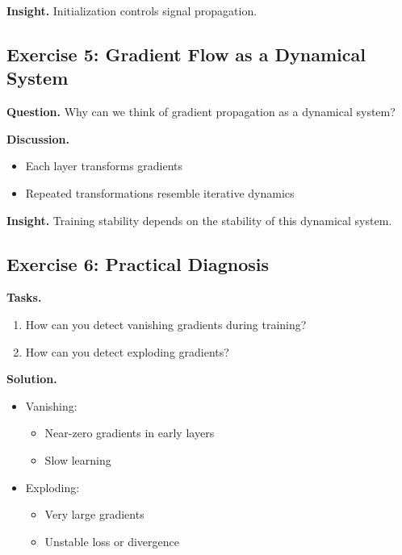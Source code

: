 \medskip

\noindent
\textbf{Insight.}  
Initialization controls signal propagation.

\subsection{Exercise 5: Gradient Flow as a Dynamical System}

\textbf{Question.}  
Why can we think of gradient propagation as a dynamical system?

\medskip

\noindent
\textbf{Discussion.}

\begin{itemize}
    \item Each layer transforms gradients
    \item Repeated transformations resemble iterative dynamics
\end{itemize}

\medskip

\noindent
\textbf{Insight.}  
Training stability depends on the stability of this dynamical system.

\subsection{Exercise 6: Practical Diagnosis}

\textbf{Tasks.}
\begin{enumerate}
    \item How can you detect vanishing gradients during training?
    \item How can you detect exploding gradients?
\end{enumerate}

\medskip

\noindent
\textbf{Solution.}

\begin{itemize}
    \item Vanishing:
    \begin{itemize}
        \item Near-zero gradients in early layers
        \item Slow learning
    \end{itemize}

    \item Exploding:
    \begin{itemize}
        \item Very large gradients
        \item Unstable loss or divergence
    \end{itemize}
\end{itemize}

